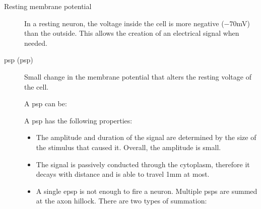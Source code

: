 \begin{description}
    \item[Resting membrane potential] 
        In a resting neuron, the voltage inside the cell is more negative ($-70$mV) than the outside.
        This allows the creation of an electrical signal when needed.

    \item[\Acl{psp} (\ac{psp})] 
        Small change in the membrane potential that alters the resting voltage of the cell.
        
        A \ac{psp} can be:

        A \ac{psp} has the following properties:
        \begin{itemize}
            \item The amplitude and duration of the signal are determined by the size of the stimulus that caused it.
                Overall, the amplitude is small.
            \item The signal is passively conducted through the cytoplasm, therefore it decays with distance and is able to travel 1mm at most.
            \item A single \acs{epsp} is not enough to fire a neuron. Multiple \acp{psp} are summed at the axon hillock.
                There are two types of summation:


\end{itemize}
\end{description}
